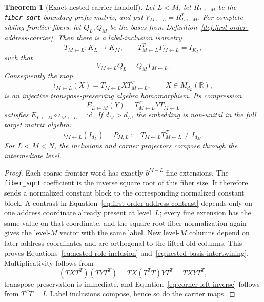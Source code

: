 \documentclass[11pt]{article}
\newtheorem{theorem}[definition]{Theorem}
\theoremstyle{remark}
\newcommand{\code}[1]{\texttt{#1}}
\newcommand{\R}{\mathbb{R}}
\numberwithin{equation}{section}
\begin{document}
\begin{theorem}[Exact nested carrier handoff]\label{thm:exact-nested-carrier-handoff}
Let \(L<M\), let \(R_{L\leftarrow M}\) be the \code{fiber\_sqrt} boundary prefix matrix, and put \(V_{M\leftarrow L}=R_{L\leftarrow M}^{T}\).  For complete sibling-frontier fibers, let \(Q_L,Q_M\) be the bases from Definition~\ref{def:first-order-address-carrier}.  Then there is a label-inclusion isometry
\begin{equation}
 T_{M\leftarrow L}:K_L\longrightarrow K_M,
 \qquad T_{M\leftarrow L}^{T}T_{M\leftarrow L}=I_{K_L},
 \label{eq:nested-role-inclusion}
\end{equation}
such that
\begin{equation}
 V_{M\leftarrow L}Q_L=Q_MT_{M\leftarrow L}.
 \label{eq:nested-basis-intertwining}
\end{equation}
Consequently the map
\begin{equation}
 \iota_{M\leftarrow L}(X)
 =T_{M\leftarrow L}XT_{M\leftarrow L}^{T},
 \qquad X\in M_{d_L}(\R),
 \label{eq:nonunital-corner-embedding}
\end{equation}
is an injective transpose-preserving algebra homomorphism.  Its compression
\begin{equation}
 E_{L\leftarrow M}(Y)=T_{M\leftarrow L}^{T}YT_{M\leftarrow L}
 \label{eq:corner-left-inverse}
\end{equation}
satisfies \(E_{L\leftarrow M}\circ\iota_{M\leftarrow L}=\mathrm{id}\).  If \(d_M>d_L\), the embedding is non-unital in the full target matrix algebra:
\begin{equation}
 \iota_{M\leftarrow L}(I_{d_L})
 =P_{M,L}:=T_{M\leftarrow L}T_{M\leftarrow L}^{T}
 \neq I_{d_M}.
 \label{eq:old-role-corner-projector}
\end{equation}
For \(L<M<N\), the inclusions and corner projectors compose through the intermediate level.
\end{theorem}

\begin{proof}
Each coarse frontier word has exactly \(b^{M-L}\) fine extensions.  The \code{fiber\_sqrt} coefficient is the inverse square root of this fiber size.  It therefore sends a normalized constant block to the corresponding normalized constant block.  A contrast in Equation~\eqref{eq:first-order-address-contrast} depends only on one address coordinate already present at level~\(L\); every fine extension has the same value on that coordinate, and the square-root fiber normalization again gives the level-\(M\) vector with the same label.  New level-\(M\) columns depend on later address coordinates and are orthogonal to the lifted old columns.  This proves Equations~\eqref{eq:nested-role-inclusion} and~\eqref{eq:nested-basis-intertwining}.  Multiplicativity follows from
\[
 (TXT^T)(TYT^T)=TX(T^TT)YT^T=TXYT^T,
\]
transpose preservation is immediate, and Equation~\eqref{eq:corner-left-inverse} follows from \(T^TT=I\).  Label inclusions compose, hence so do the carrier maps.
\end{proof}
\end{document}
